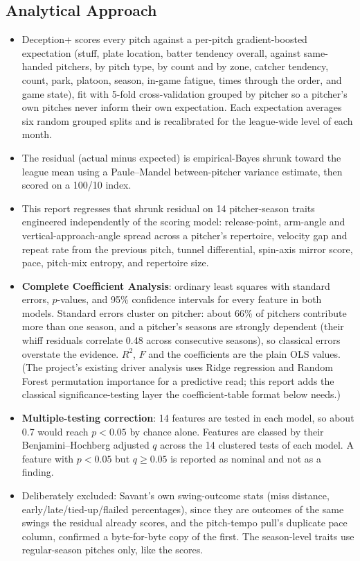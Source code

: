 \documentclass[11pt]{article}
\begin{document}
\subsection*{Analytical Approach}
\begin{itemize}
\item Deception+ scores every pitch against a per-pitch gradient-boosted expectation (stuff, plate location, batter tendency overall, against same-handed pitchers, by pitch type, by count and by zone, catcher tendency, count, park, platoon, season, in-game fatigue, times through the order, and game state), fit with 5-fold cross-validation grouped by pitcher so a pitcher's own pitches never inform their own expectation. Each expectation averages six random grouped splits and is recalibrated for the league-wide level of each month.
\item The residual (actual minus expected) is empirical-Bayes shrunk toward the league mean using a Paule--Mandel between-pitcher variance estimate, then scored on a 100/10 index.
\item This report regresses that shrunk residual on 14 pitcher-season traits engineered independently of the scoring model: release-point, arm-angle and vertical-approach-angle spread across a pitcher's repertoire, velocity gap and repeat rate from the previous pitch, tunnel differential, spin-axis mirror score, pace, pitch-mix entropy, and repertoire size.
\item \textbf{Complete Coefficient Analysis}: ordinary least squares with standard errors, $p$-values, and 95\% confidence intervals for every feature in both models. Standard errors cluster on pitcher: about 66\% of pitchers contribute more than one season, and a pitcher's seasons are strongly dependent (their whiff residuals correlate 0.48 across consecutive seasons), so classical errors overstate the evidence. $R^2$, $F$ and the coefficients are the plain OLS values. (The project's existing driver analysis uses Ridge regression and Random Forest permutation importance for a predictive read; this report adds the classical significance-testing layer the coefficient-table format below needs.)
\item \textbf{Multiple-testing correction}: 14 features are tested in each model, so about 0.7 would reach $p<0.05$ by chance alone. Features are classed by their Benjamini--Hochberg adjusted $q$ across the 14 clustered tests of each model. A feature with $p<0.05$ but $q\ge0.05$ is reported as nominal and not as a finding.
\item Deliberately excluded: Savant's own swing-outcome stats (miss distance, early/late/tied-up/flailed percentages), since they are outcomes of the same swings the residual already scores, and the pitch-tempo pull's duplicate pace column, confirmed a byte-for-byte copy of the first. The season-level traits use regular-season pitches only, like the scores.
\end{itemize}
\end{document}
